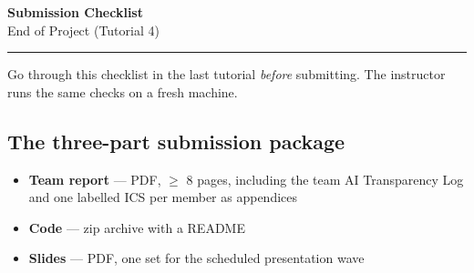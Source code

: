 \documentclass[11pt]{article}
\begin{document}
\begin{center}
  {\LARGE\bfseries Submission Checklist}\\[0.4em]
  {\large End of Project (Tutorial 4)}
\end{center}
\vspace{0.2em}
\hrule
\vspace{0.6em}

Go through this checklist in the last tutorial \emph{before} submitting. The
instructor runs the same checks on a fresh machine.

\subsection*{The three-part submission package}
\begin{itemize}[leftmargin=2.4em, itemsep=1pt]
  \item[$\square$] \textbf{Team report} --- PDF, $\geq$ 8 pages, including the
  team AI Transparency Log and one labelled ICS per member as appendices
  \item[$\square$] \textbf{Code} --- zip archive with a README
  \item[$\square$] \textbf{Slides} --- PDF, one set for the scheduled presentation wave
\end{itemize}

\end{document}
